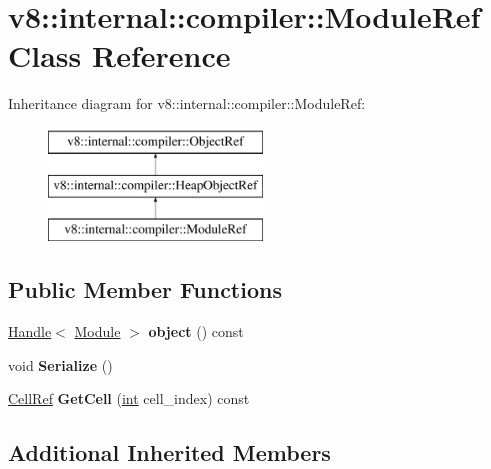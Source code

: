 \hypertarget{classv8_1_1internal_1_1compiler_1_1ModuleRef}{}\section{v8\+:\+:internal\+:\+:compiler\+:\+:Module\+Ref Class Reference}
\label{classv8_1_1internal_1_1compiler_1_1ModuleRef}
Inheritance diagram for v8\+:\+:internal\+:\+:compiler\+:\+:Module\+Ref\+:\begin{figure}[H]
\begin{center}
\leavevmode
\includegraphics[height=3.000000cm]{classv8_1_1internal_1_1compiler_1_1ModuleRef}
\end{center}
\end{figure}
\subsection*{Public Member Functions}
\begin{DoxyCompactItemize}
\item 
\mbox{\label{classv8_1_1internal_1_1compiler_1_1ModuleRef_a1afab8fbee9bd38c4977d04878ab4765}} 
\mbox{\hyperlink{classv8_1_1internal_1_1Handle}{Handle}}$<$ \mbox{\hyperlink{classv8_1_1internal_1_1Module}{Module}} $>$ {\bfseries object} () const
\item 
\mbox{\label{classv8_1_1internal_1_1compiler_1_1ModuleRef_ac845a241181dc32a5275796256534a65}} 
void {\bfseries Serialize} ()
\item 
\mbox{\label{classv8_1_1internal_1_1compiler_1_1ModuleRef_a1df84fdbaeec04a6092c8eff0e177f6c}} 
\mbox{\hyperlink{classv8_1_1internal_1_1compiler_1_1CellRef}{Cell\+Ref}} {\bfseries Get\+Cell} (\mbox{\hyperlink{classint}{int}} cell\+\_\+index) const
\end{DoxyCompactItemize}
\subsection*{Additional Inherited Members}


